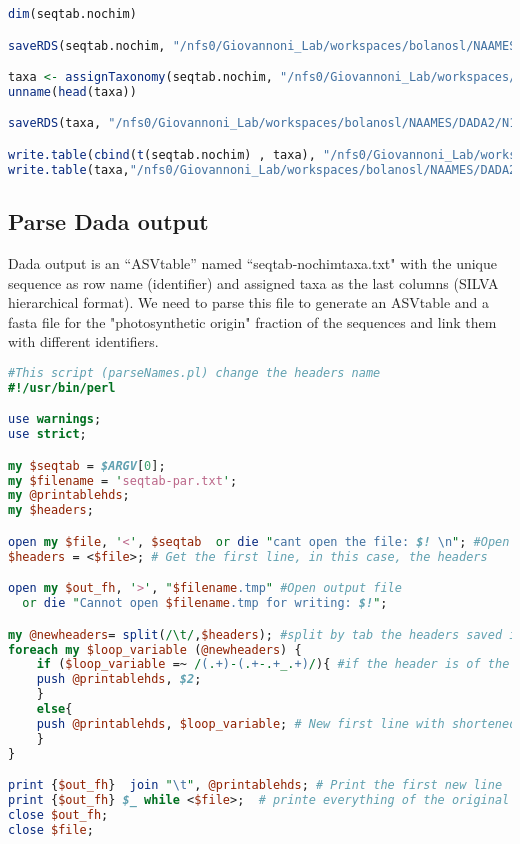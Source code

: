 \documentclass{article}
\begin{document}
\begin{lstlisting}[language=R,caption={DadaR.R}]
dim(seqtab.nochim)

saveRDS(seqtab.nochim, "/nfs0/Giovannoni_Lab/workspaces/bolanosl/NAAMES/DADA2/N1N2/seqtab.nochim.rds")

taxa <- assignTaxonomy(seqtab.nochim, "/nfs0/Giovannoni_Lab/workspaces/bolanosl/BIOS/ProcessSeqs/SEQ1pr/silva_nr_v123_train_set.fa")
unname(head(taxa))

saveRDS(taxa, "/nfs0/Giovannoni_Lab/workspaces/bolanosl/NAAMES/DADA2/N1N2/taxa.rds")

write.table(cbind(t(seqtab.nochim) , taxa), "/nfs0/Giovannoni_Lab/workspaces/bolanosl/NAAMES/DADA2/N1N2/seqtab-nochimtaxa.txt", sep="\t", row.names=TRUE, col.names=NA, quote=FALSE)
write.table(taxa,"/nfs0/Giovannoni_Lab/workspaces/bolanosl/NAAMES/DADA2/N1N2/N1N2/taxa.txt", sep="\t", row.names=TRUE, col.names=NA, quote=FALSE )
\end{lstlisting}

\subsection{Parse Dada output}
Dada output is an “ASVtable” named “seqtab-nochimtaxa.txt" with the unique sequence as row name (identifier) and assigned taxa as the last columns (SILVA hierarchical format). We need to parse this file to generate an ASVtable and a fasta file for the "photosynthetic origin" fraction of the sequences and link them with different identifiers. 

\begin{lstlisting}[language=perl,caption={parseNames.pl}]
#This script (parseNames.pl) change the headers name
#!/usr/bin/perl

use warnings;
use strict;

my $seqtab = $ARGV[0];
my $filename = 'seqtab-par.txt';
my @printablehds;
my $headers;

open my $file, '<', $seqtab  or die "cant open the file: $! \n"; #Open Fileders
$headers = <$file>; # Get the first line, in this case, the headers

open my $out_fh, '>', "$filename.tmp" #Open output file
  or die "Cannot open $filename.tmp for writing: $!";

my @newheaders= split(/\t/,$headers); #split by tab the headers saved in the new line
foreach my $loop_variable (@newheaders) {
	if ($loop_variable =~ /(.+)-(.+-.+_.+)/){ #if the header is of the form X-X-X-X get just the last significant part
	push @printablehds, $2; 
	}
	else{
	push @printablehds, $loop_variable; # New first line with shortened headers
	}
}

print {$out_fh}  join "\t", @printablehds; # Print the first new line
print {$out_fh} $_ while <$file>;  # printe everything of the original file except the 1st line
close $out_fh;
close $file;
\end{lstlisting}
\end{document}
